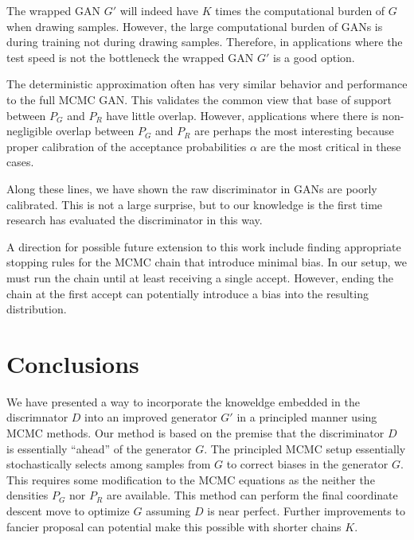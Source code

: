 \documentclass{article}
\begin{document}
The wrapped GAN $G'$ will indeed have $K$ times the computational burden of $G$ when drawing samples.
However, the large computational burden of GANs is during training not during drawing samples.
Therefore, in applications where the test speed is not the bottleneck the wrapped GAN $G'$ is a good option.

The deterministic approximation often has very similar behavior and performance to the full MCMC GAN\@.
This validates the common view that base of support between $P_G$ and $P_R$ have little overlap.
However, applications where there is non-negligible overlap between $P_G$ and $P_R$ are perhaps the most interesting because proper calibration of the acceptance probabilities $\alpha$ are the most critical in these cases.

Along these lines, we have shown the raw discriminator in GANs are poorly calibrated.
This is not a large surprise, but to our knowledge is the first time research has evaluated the discriminator in this way.

A direction for possible future extension to this work include finding appropriate stopping rules for the MCMC chain that introduce minimal bias.
In our setup, we must run the chain until at least receiving a single accept.
However, ending the chain at the first accept can potentially introduce a bias into the resulting distribution.

\section{Conclusions}

We have presented a way to incorporate the knoweldge embedded in the discrimnator $D$ into an improved generator $G'$ in a principled manner using MCMC methods.
Our method is based on the premise that the discriminator $D$ is essentially ``ahead'' of the generator $G$.
The principled MCMC setup essentially stochastically selects among samples from $G$ to correct biases in the generator $G$.
This requires some modification to the MCMC equations as the neither the densities $P_G$ nor $P_R$ are available.
This method can perform the final coordinate descent move to optimize $G$ assuming $D$ is near perfect.
Further improvements to fancier proposal can potential make this possible with shorter chains $K$.
\end{document}
